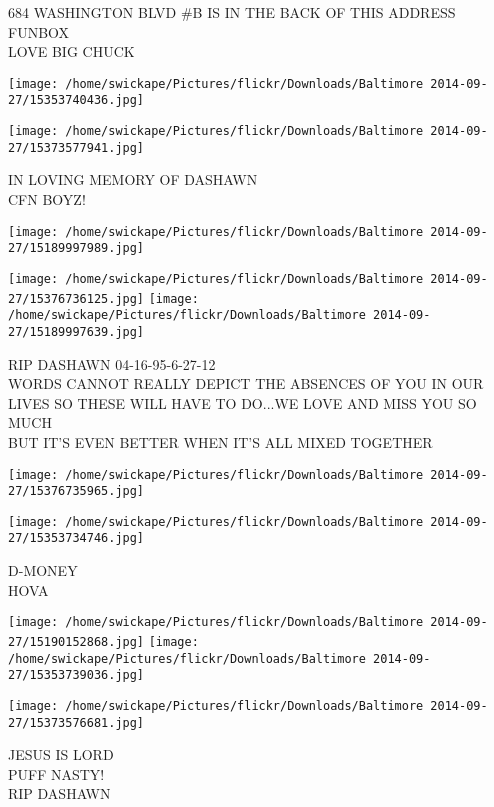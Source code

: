 \documentclass[10pt,letterpaper]{article}
\begin{document}
684 WASHINGTON BLVD \#B IS IN THE BACK OF THIS ADDRESS\\
FUNBOX\\
LOVE BIG CHUCK
\pagebreak

\texttt{[image: /home/swickape/Pictures/flickr/Downloads/Baltimore 2014-09-27/15353740436.jpg]}

\vspace{0.25in}
\texttt{[image: /home/swickape/Pictures/flickr/Downloads/Baltimore 2014-09-27/15373577941.jpg]}

IN LOVING MEMORY OF DASHAWN\\
CFN BOYZ!
\pagebreak

\texttt{[image: /home/swickape/Pictures/flickr/Downloads/Baltimore 2014-09-27/15189997989.jpg]}

\vspace{0.25in}
\texttt{[image: /home/swickape/Pictures/flickr/Downloads/Baltimore 2014-09-27/15376736125.jpg]}
\texttt{[image: /home/swickape/Pictures/flickr/Downloads/Baltimore 2014-09-27/15189997639.jpg]}

RIP DASHAWN 04{-}16{-}95{-}6{-}27{-}12\\
WORDS CANNOT REALLY DEPICT THE ABSENCES OF YOU IN OUR LIVES SO THESE WILL HAVE TO DO...WE LOVE AND MISS YOU SO MUCH\\
BUT IT'S EVEN BETTER WHEN IT'S ALL MIXED TOGETHER
\pagebreak

\texttt{[image: /home/swickape/Pictures/flickr/Downloads/Baltimore 2014-09-27/15376735965.jpg]}

\vspace{0.25in}
\texttt{[image: /home/swickape/Pictures/flickr/Downloads/Baltimore 2014-09-27/15353734746.jpg]}

D{-}MONEY\\
HOVA
\pagebreak

\texttt{[image: /home/swickape/Pictures/flickr/Downloads/Baltimore 2014-09-27/15190152868.jpg]}
\texttt{[image: /home/swickape/Pictures/flickr/Downloads/Baltimore 2014-09-27/15353739036.jpg]}

\vspace{0.25in}
\texttt{[image: /home/swickape/Pictures/flickr/Downloads/Baltimore 2014-09-27/15373576681.jpg]}

JESUS IS LORD\\
PUFF NASTY!\\
RIP DASHAWN
\pagebreak
\end{document}
